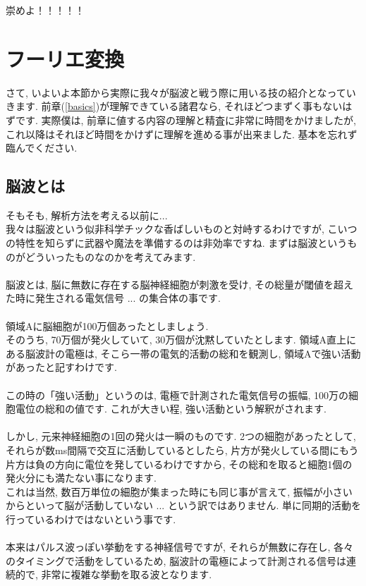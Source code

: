 \documentclass[11pt,a4paper]{jreport}
\begin{document}
崇めよ！！！！！\\

\section{フーリエ変換}
さて, いよいよ本節から実際に我々が脳波と戦う際に用いる技の紹介となっていきます. 前章(\ref{basics})が理解できている諸君なら, それほどつまずく事もないはずです. 実際僕は, 前章に値する内容の理解と精査に非常に時間をかけましたが, これ以降はそれほど時間をかけずに理解を進める事が出来ました. 基本を忘れず臨んでください.
\subsection{脳波とは}
そもそも, 解析方法を考える以前に...\\
我々は脳波という似非科学チックな香ばしいものと対峙するわけですが, こいつの特性を知らずに武器や魔法を準備するのは非効率ですね. まずは脳波というものがどういったものなのかを考えてみます. \\
\\
脳波とは, 脳に無数に存在する脳神経細胞が刺激を受け, その総量が閾値を超えた時に発生される電気信号 ... の集合体の事です.\\
\\
領域Aに脳細胞が100万個あったとしましょう. \\
そのうち, 70万個が発火していて, 30万個が沈黙していたとします. 領域A直上にある脳波計の電極は, そこら一帯の電気的活動の総和を観測し, 領域Aで強い活動があったと記すわけです.\\
\\
この時の「強い活動」というのは, 電極で計測された電気信号の振幅, 100万の細胞電位の総和の値です. これが大きい程, 強い活動という解釈がされます.\\
\\
しかし, 元来神経細胞の1回の発火は一瞬のものです. 2つの細胞があったとして, それらが数ms間隔で交互に活動しているとしたら, 片方が発火している間にもう片方は負の方向に電位を発しているわけですから, その総和を取ると細胞1個の発火分にも満たない事になります. \\
これは当然, 数百万単位の細胞が集まった時にも同じ事が言えて, 振幅が小さいからといって脳が活動していない ... という訳ではありません. 単に同期的活動を行っているわけではないという事です.\\
\\
本来はパルス波っぽい挙動をする神経信号ですが, それらが無数に存在し, 各々のタイミングで活動をしているため, 脳波計の電極によって計測される信号は連続的で, 非常に複雑な挙動を取る波となります. \\
\end{document}
